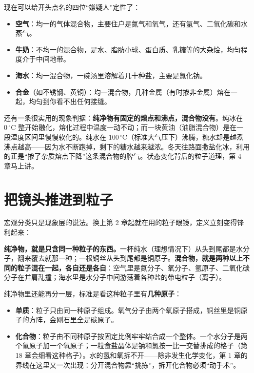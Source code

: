 现在可以给开头点名的四位“嫌疑人”定性了：

\begin{itemize}[itemsep=2pt]
\item \textbf{空气}：均一的气体混合物，主要住户是氮气和氧气，还有氩气、二氧化碳和水蒸气。
\item \textbf{牛奶}：不均一的混合物，是水、脂肪小球、蛋白质、乳糖等的大杂烩，均匀程度介于中间地带。
\item \textbf{海水}：均一混合物，一碗汤里溶解着几十种盐，主要是氯化钠。
\item \textbf{合金}（如不锈钢、黄铜）：均一混合物，几种金属（有时掺非金属）熔在一起，均匀到你看不出任何接缝。
\end{itemize}

还有一条很实用的现象判据：\textbf{纯净物有固定的熔点和沸点，混合物没有}。纯冰在 $0\,^{\circ}\mathrm{C}$ 整开始融化，熔化过程中温度一动不动；而一块黄油（油脂混合物）是在一段温度区间里慢慢软化的。纯水在 $100\,^{\circ}\mathrm{C}$（标准大气压下）沸腾，糖水却是越煮沸点越高——因为水不断跑掉，剩下的糖水越来越浓。冬天往路面撒盐化冰，利用的正是“掺了杂质熔点下降”这条混合物的脾气。状态变化背后的粒子道理，第 4 章马上讲。

\section{把镜头推进到粒子}

宏观分类只是现象层的说法。换上第 2 章起就在用的粒子眼镜，定义立刻变得锋利起来：

\textbf{纯净物，就是只含同一种粒子的东西。}一杯纯水（理想情况下）从头到尾都是水分子，翻来覆去就那一种；一根铜丝从头到尾都是铜原子。\textbf{混合物，就是两种以上不同的粒子混在一起，各自还是各自}：空气里是氮分子、氧分子、氩原子、二氧化碳分子在并肩乱撞；海水里是水分子中间游荡着各种盐的带电粒子（离子）。

纯净物里还能再分一层，标准是看这种粒子里有\textbf{几种原子}：

\begin{itemize}[itemsep=2pt]
\item \textbf{单质}：粒子只由同一种原子组成。氧气分子由两个氧原子搭成，铜丝里是铜原子的方阵，金刚石里全是碳原子。
\item \textbf{化合物}：粒子由不同种原子按固定比例牢牢结合成一个整体。一个水分子是两个氢原子加一个氧原子；一粒食盐晶体是钠和氯按一比一交替排成的格子（第 18 章会细看这种格子）。水的氢和氧拆不开——除非发生化学变化，第 1 章的界线在这里又一次出现：分开混合物靠“挑拣”，拆开化合物必须“动手术”。
\end{itemize}

